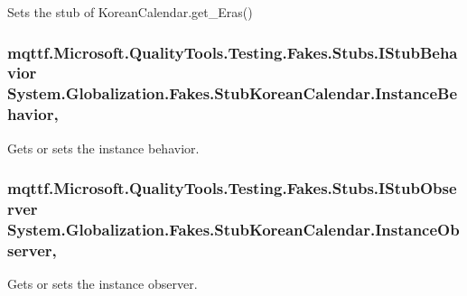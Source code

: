 Sets the stub of Korean\-Calendar.\-get\-\_\-\-Eras()

\hypertarget{class_system_1_1_globalization_1_1_fakes_1_1_stub_korean_calendar_a1ec80e6e5c642eb81c9a1c9ba6d09d66}{
\subsubsection[{Instance\-Behavior}]{\setlength{\rightskip}{0pt plus 5cm}mqttf.\-Microsoft.\-Quality\-Tools.\-Testing.\-Fakes.\-Stubs.\-I\-Stub\-Behavior System.\-Globalization.\-Fakes.\-Stub\-Korean\-Calendar.\-Instance\-Behavior\hspace{0.3cm}{\ttfamily [get]}, {\ttfamily [set]}}}\label{class_system_1_1_globalization_1_1_fakes_1_1_stub_korean_calendar_a1ec80e6e5c642eb81c9a1c9ba6d09d66}


Gets or sets the instance behavior.

\hypertarget{class_system_1_1_globalization_1_1_fakes_1_1_stub_korean_calendar_a2053cf238281665b80d314c605f80e70}{
\subsubsection[{Instance\-Observer}]{\setlength{\rightskip}{0pt plus 5cm}mqttf.\-Microsoft.\-Quality\-Tools.\-Testing.\-Fakes.\-Stubs.\-I\-Stub\-Observer System.\-Globalization.\-Fakes.\-Stub\-Korean\-Calendar.\-Instance\-Observer\hspace{0.3cm}{\ttfamily [get]}, {\ttfamily [set]}}}\label{class_system_1_1_globalization_1_1_fakes_1_1_stub_korean_calendar_a2053cf238281665b80d314c605f80e70}


Gets or sets the instance observer.


